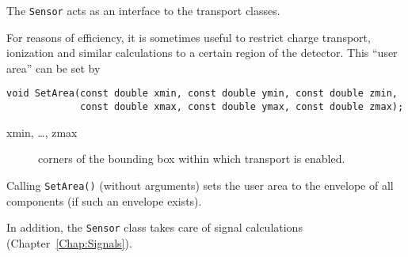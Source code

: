 The \texttt{Sensor} acts as an interface to the transport classes.

For reasons of efficiency, it is sometimes useful to restrict 
charge transport, ionization and similar calculations to a 
certain region of the detector.
This ``user area'' can be set by
\begin{lstlisting}
void SetArea(const double xmin, const double ymin, const double zmin,
             const double xmax, const double ymax, const double zmax);
\end{lstlisting} 
\begin{description}
\item[xmin, \dots, zmax]
corners of the bounding box within which transport is enabled. 
\end{description}
Calling \texttt{SetArea()} (without arguments) sets the 
user area to the envelope of all components (if such an envelope exists).

In addition, the \texttt{Sensor} class takes care of 
signal calculations (Chapter~\ref{Chap:Signals}).


